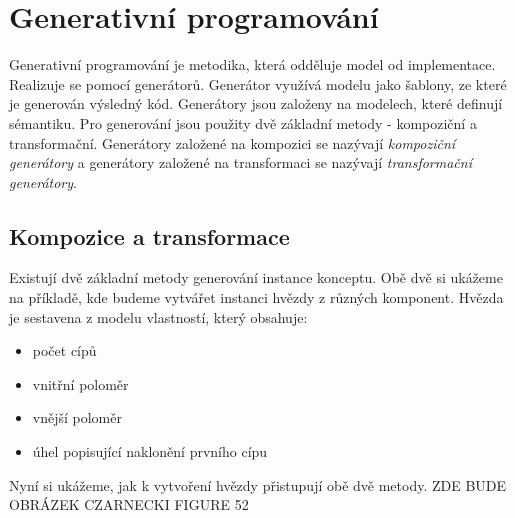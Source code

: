 \chapter{Generativní programování}
Generativní programování je metodika, která odděluje model od implementace. Realizuje se pomocí generátorů. Generátor využívá modelu jako šablony, ze které je generován výsledný kód. Generátory jsou založeny na modelech, které definují sémantiku. Pro generování jsou použity dvě základní metody - kompoziční a transformační. Generátory založené na kompozici se nazývají \textit{kompoziční generátory} a generátory založené na transformaci se nazývají \textit{transformační generátory}.

\section{Kompozice a transformace}
Existují dvě základní metody generování instance konceptu. Obě dvě si ukážeme na příkladě, kde budeme vytvářet instanci hvězdy z různých komponent. Hvězda je sestavena z modelu vlastností, který obsahuje:
\begin{itemize}
	\item počet cípů
	\item vnitřní poloměr
	\item vnější poloměr
	\item úhel popisující naklonění prvního cípu
\end{itemize}
Nyní si ukážeme, jak k vytvoření hvězdy přistupují obě dvě metody.
\newline
\newline
ZDE BUDE OBRÁZEK CZARNECKI FIGURE 52
\newline
\newline

